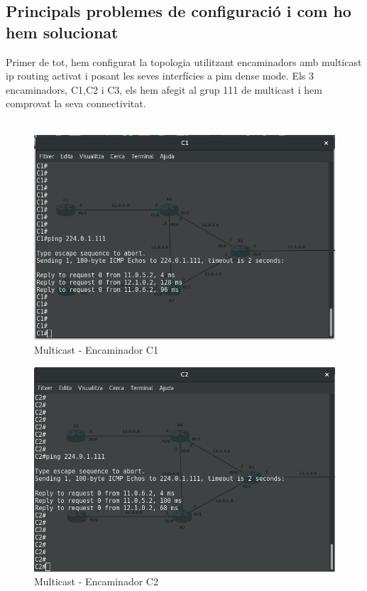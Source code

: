 \documentclass[10pt]{article}
\begin{document}
\subsection{Principals problemes de configuració i com ho hem solucionat}
Primer de tot, hem configurat la topologia utilitzant encaminadors amb multicast ip routing activat i posant les seves interfícies a pim dense mode. Els 3 encaminadors, C1,C2 i C3, els hem afegit al grup 111 de multicast i hem comprovat la seva connectivitat.
\\\\
\begin{figure}[H]
\begin{center}
\includegraphics[scale=0.34]{Images/1aPartC1.png}
\caption{Multicast - Encaminador C1}
\end{center}
\end{figure}
\begin{figure}[H]
\begin{center}
\includegraphics[scale=0.34]{Images/1aPartC2.png}
\caption{Multicast - Encaminador C2}
\end{center}
\end{figure}
\end{document}
